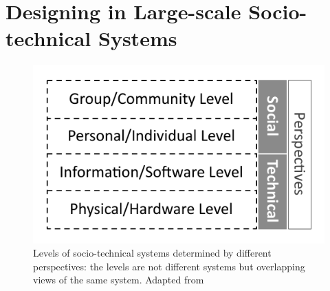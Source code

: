 \section{Designing in Large-scale Socio-technical Systems}
\label{sec:design}



\begin{figure}[t]
\sidecaption[t]
\includegraphics[scale=.68]{img/sts_levels.pdf}
\caption{Levels of socio-technical systems determined by different perspectives: the levels are not different systems but overlapping views of the  same system. Adapted from \cite{Whitworth2009,Whitworth2013}}
\label{fig:sts_levels} 
\end{figure}

